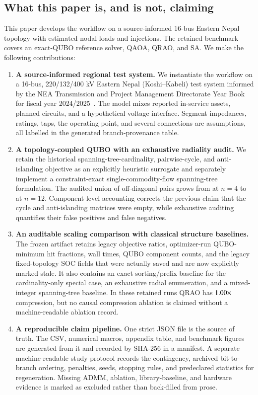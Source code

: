 \documentclass[5p,twocolumn,number,sort&compress,nopreprintline]{elsarticle}
\begin{document}
\subsection{What this paper is, and is not, claiming}
This paper develops the workflow on a source-informed 16-bus Eastern
Nepal topology with estimated nodal loads and injections. The retained benchmark
covers an exact-QUBO reference solver, QAOA, QRAO, and SA. We make the following
contributions:

\begin{enumerate}
\item \textbf{A source-informed regional test system.} We instantiate
the workflow on a 16-bus, 220/132/400 kV Eastern Nepal
(Koshi--Kabeli) test system informed by the NEA Transmission and
Project Management Directorate Year Book for fiscal year
2024/2025~\cite{nea2082yearbook,nea_transmission_map}. The model mixes
reported in-service assets, planned circuits, and a hypothetical
voltage interface. Segment impedances, ratings, taps, the operating
point, and several connections are assumptions, all labelled in the
generated branch-provenance table.

\item \textbf{A topology-coupled QUBO with an exhaustive radiality audit.}
We retain the historical spanning-tree-cardinality, pairwise-cycle,
and anti-islanding objective as an explicitly heuristic surrogate and
separately implement a constraint-exact single-commodity-flow spanning-tree
formulation. The audited union of
off-diagonal pairs grows from \MinQuboCouplings{} at $n=4$ to
\MaxQuboCouplings{} at $n=12$. Component-level accounting corrects the
previous claim that the cycle and anti-islanding matrices were empty,
while exhaustive auditing quantifies their false positives and false
negatives.

\item \textbf{An auditable scaling comparison with classical structure
baselines.} The frozen artifact
retains legacy objective ratios, optimizer-run QUBO-minimum hit fractions, wall times,
QUBO component counts, and the legacy fixed-topology SOC fields that
were actually saved and are now explicitly marked stale. It also contains
an exact sorting/prefix baseline for the cardinality-only special case,
an exhaustive radial enumeration, and a mixed-integer spanning-tree baseline.
In these retained runs QRAO has
$1.00\times$ compression, but no causal compression
ablation is claimed without a machine-readable ablation record.

\item \textbf{A reproducible claim pipeline.} One strict JSON file is
the source of truth. The CSV, numerical macros, appendix table, and
benchmark figures are generated from it and recorded by SHA-256 in a
manifest. A separate machine-readable study protocol records the
contingency, archived bit-to-branch ordering, penalties, seeds, stopping rules, and
predeclared statistics for regeneration. Missing ADMM, ablation,
library-baseline, and hardware
evidence is marked as excluded rather than back-filled from prose.
\end{enumerate}
\end{document}
